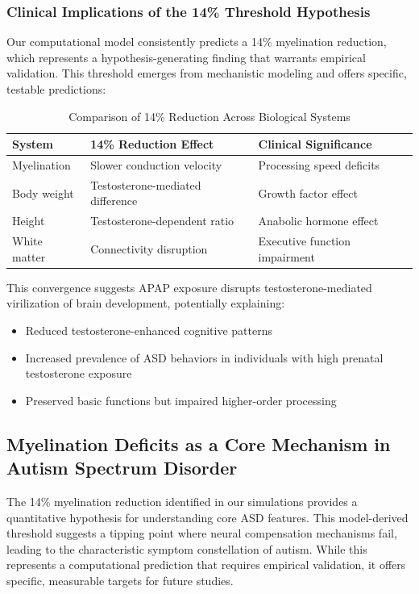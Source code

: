\documentclass[11pt]{article}
\let\oldsubsection\subsection
\renewcommand{\subsection}[1]{\oldsubsection{#1}\setlength{\leftskip}{0.75em}}
\let\oldsubsubsection\subsubsection
\renewcommand{\subsubsection}[1]{\oldsubsubsection{#1}\setlength{\leftskip}{1.5em}}
\begin{document}
\subsubsection{Clinical Implications of the 14\% Threshold Hypothesis}

Our computational model consistently predicts a 14\% myelination reduction, which represents a hypothesis-generating finding that warrants empirical validation. This threshold emerges from mechanistic modeling and offers specific, testable predictions:

\begin{table}[h]
\centering
\caption{Comparison of 14\% Reduction Across Biological Systems}
\begin{tabular}{|l|l|l|}
\hline
\textbf{System} & \textbf{14\% Reduction Effect} & \textbf{Clinical Significance} \\
\hline
Myelination & Slower conduction velocity & Processing speed deficits \\
Body weight & Testosterone-mediated difference & Growth factor effect \\
Height & Testosterone-dependent ratio & Anabolic hormone effect \\
White matter & Connectivity disruption & Executive function impairment \\
\hline
\end{tabular}
\end{table}

This convergence suggests APAP exposure disrupts testosterone-mediated virilization of brain development, potentially explaining:
\begin{itemize}
\item Reduced testosterone-enhanced cognitive patterns
\item Increased prevalence of ASD behaviors in individuals with high prenatal testosterone exposure
\item Preserved basic functions but impaired higher-order processing
\end{itemize}

\subsection{Myelination Deficits as a Core Mechanism in Autism Spectrum Disorder}

The 14\% myelination reduction identified in our simulations provides a quantitative hypothesis for understanding core ASD features. This model-derived threshold suggests a tipping point where neural compensation mechanisms fail, leading to the characteristic symptom constellation of autism. While this represents a computational prediction that requires empirical validation, it offers specific, measurable targets for future studies.
\end{document}
